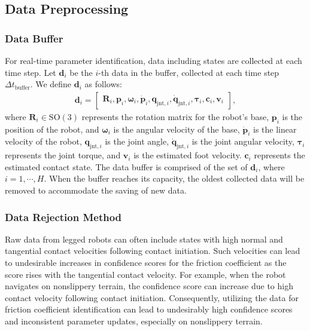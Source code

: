 
\subsection{Data Preprocessing}
\subsubsection{{Data Buffer}}
\label{eq:databuffer}
For real-time parameter identification, data including states are collected at each time step. Let $\mathbf{d}_{i}$ be the ${i}$-th data in the buffer, collected at each time step $\Delta{t}_\mathrm{buffer}$. We define $\mathbf{d}_{i}$ as follows:
\begin{align}
\mathbf{d}_{i} = \begin{bmatrix}\mathbf{R}_{i}, \mathbf{p}_{i}, \boldsymbol{\omega}_{i}, \mathbf{\dot{p}}_{i}, \mathbf{q}_{\mathrm{jnt},i}, \mathbf{\dot{q}}_{\mathrm{jnt},i}, \boldsymbol{\tau}_{i}, \mathbf{c}_{i}, \mathbf{v}_{i}\end{bmatrix},
\end{align}
where $\mathbf{R}_{i}\in\text{SO}(3)$ represents the rotation matrix for the robot's base, $\mathbf{p}_{i}$ is the position of the robot, and $\boldsymbol{\omega}_{i}$ is the angular velocity of the base, $\mathbf{\dot{p}}_{i}$ is the linear velocity of the robot, $\mathbf{q}_{\mathrm{jnt},i}$ is the joint angle, $\mathbf{\dot{q}}_{\mathrm{jnt},i}$ is the joint angular velocity, $\boldsymbol{\tau}_{i}$ represents the joint torque, and $\mathbf{v}_{i}$ is the estimated foot velocity. $\mathbf{c}_{i}$ represents the estimated contact state. 
The data buffer is comprised of the set of $\mathbf{d}_{i}$, where $i=1,\cdots,H$. When the buffer reaches its capacity, the oldest collected data will be removed to accommodate the saving of new data.

\subsubsection{Data Rejection Method}
\label{sec:rej}
Raw data from legged robots can often include states with high normal and tangential contact velocities following contact initiation. Such velocities can lead to undesirable increases in confidence scores for the friction coefficient as the score rises with the tangential contact velocity. For example, when the robot navigates on nonslippery terrain, the confidence score can increase due to high contact velocity following contact initiation. Consequently, utilizing the data for friction coefficient identification can lead to undesirably high confidence scores and inconsistent parameter updates, especially on nonslippery terrain.

